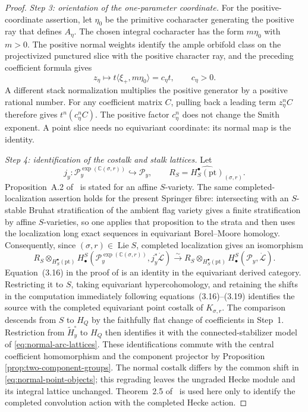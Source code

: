 \documentclass[11pt]{amsart}
\theoremstyle{definition}
\theoremstyle{remark}
\begin{document}
\begin{proof}
\smallskip
\noindent\emph{Step 3: orientation of the one-parameter coordinate.}
For the positive-coordinate assertion, let $\eta_0$ be the primitive
cocharacter generating the positive ray that defines $A_\eta$.  The chosen
integral cocharacter has the form $m\eta_0$ with $m>0$.  The positive normal
weights identify the ample orbifold class on the projectivized punctured
slice with the positive character ray, and the preceding coefficient formula
gives
\[
 z_\eta\longmapsto
 t\langle\xi_+,m\eta_0\rangle=c_\eta t,
 \qquad c_\eta>0.
\]
A different stack normalization multiplies the positive generator by a
positive rational number.  For any coefficient matrix $C$, pulling back a
leading term $z_\eta^nC$ therefore
gives $t^n(c_\eta^nC)$.  The positive factor $c_\eta^n$ does not change the
Smith exponent.  A point slice needs no equivariant coordinate: its
normal map is the identity.

\smallskip
\noindent\emph{Step 4: identification of the costalk and stalk lattices.}
Let
\[
 j_y:\mathcal P_y^{\exp(\mathbb C(\sigma,r))}
       \hookrightarrow\mathcal P_y,
 \qquad
 R_S=\widehat{H_S^\bullet(\mathrm{pt})}_{(\sigma,r)}.
\]
Proposition~A.2 of~\cite{Solleveld} is stated for an affine $S$-variety.
The same completed-localization assertion holds for the present Springer
fibre: intersecting with an $S$-stable Bruhat stratification of the ambient
flag variety gives a finite stratification by affine $S$-varieties, so one
applies that proposition to the strata and then uses the localization long
exact sequences in equivariant Borel--Moore homology.  Consequently, since
$(\sigma,r)\in\operatorname{Lie}S$,
completed localization gives an isomorphism
\[
 R_S\otimes_{H_S^\bullet(\mathrm{pt})}
 H_\bullet^S\!\left(
   \mathcal P_y^{\exp(\mathbb C(\sigma,r))},j_y^*\dot{\mathcal L}
 \right)
 \xrightarrow{\sim}
 R_S\otimes_{H_S^\bullet(\mathrm{pt})}
 H_\bullet^S(\mathcal P_y,\dot{\mathcal L}).
\]
Equation~(3.16) in the proof of \cite[Proposition~3.5(a)]{Solleveld} is an
identity in the equivariant derived category.  Restricting it to $S$, taking
equivariant hypercohomology, and retaining the shifts in the computation
immediately following equations~(3.16)--(3.19) identifies the source with
the completed equivariant point costalk of $K_{\sigma,r}$.
The comparison descends from $S$ to $H_Q$ by the faithfully flat
change of coefficients in Step~1.  Restriction from
$\widetilde H_y^\circ$ to $H_Q$ then identifies it with the
connected-stabilizer model of \eqref{eq:normal-arc-lattices}.
These identifications commute with the central coefficient
homomorphism and the component projector by Proposition
\ref{prop:two-component-groups}.  The normal costalk differs by the common shift in
\eqref{eq:normal-point-objects}; this regrading leaves the ungraded
Hecke module and its integral lattice unchanged.  Theorem~2.5
of~\cite{Solleveld} is used here
only to identify the completed convolution action with the completed Hecke
action.


\end{proof}
\end{document}

